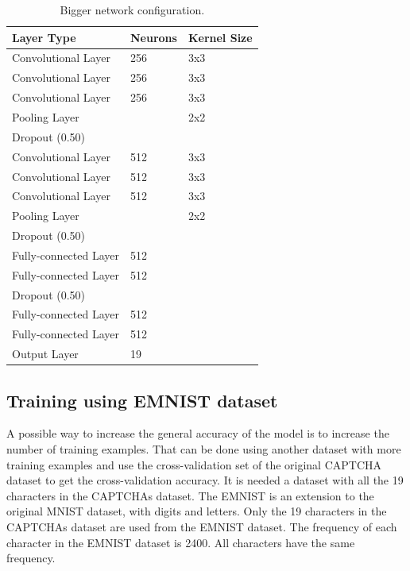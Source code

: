 \documentclass[journal]{IEEEtran}
\begin{document}
\begin{table}[]
\centering
\caption{Bigger network configuration.}
\label{table:network_configuration_bigger}
\begin{tabular}{|l|l|l|}
\hline
\textbf{Layer Type}   & \textbf{Neurons} & \textbf{Kernel Size} \\ \hline
Convolutional Layer   & 256              & 3x3                  \\ \hline
Convolutional Layer   & 256              & 3x3                  \\ \hline
Convolutional Layer   & 256              & 3x3                  \\ \hline
Pooling Layer         &                  & 2x2                  \\ \hline
Dropout (0.50)        &                  &                      \\ \hline
Convolutional Layer   & 512              & 3x3                  \\ \hline
Convolutional Layer   & 512              & 3x3                  \\ \hline
Convolutional Layer   & 512              & 3x3                  \\ \hline
Pooling Layer         &                  & 2x2                  \\ \hline
Dropout (0.50)        &                  &                      \\ \hline
Fully-connected Layer & 512              &                      \\ \hline
Fully-connected Layer & 512              &                      \\ \hline
Dropout (0.50)        &                  &                      \\ \hline
Fully-connected Layer & 512              &                      \\ \hline
Fully-connected Layer & 512              &                      \\ \hline
Output Layer          & 19               &                      \\ \hline
\end{tabular}
\end{table}

\subsection{Training using EMNIST dataset}

A possible way to increase the general accuracy of the model is to increase the number of training examples. That can be done using another dataset with more training examples and use the cross-validation set of the original CAPTCHA dataset to get the cross-validation accuracy. It is needed a dataset with all the 19 characters in the CAPTCHAs dataset. The EMNIST \cite{DBLP:journals/corr/CohenATS17} is an extension to the original MNIST dataset, with digits and letters. Only the 19 characters in the CAPTCHAs dataset are used from the EMNIST dataset. The frequency of each character in the EMNIST dataset is 2400. All characters have the same frequency.
\end{document}
